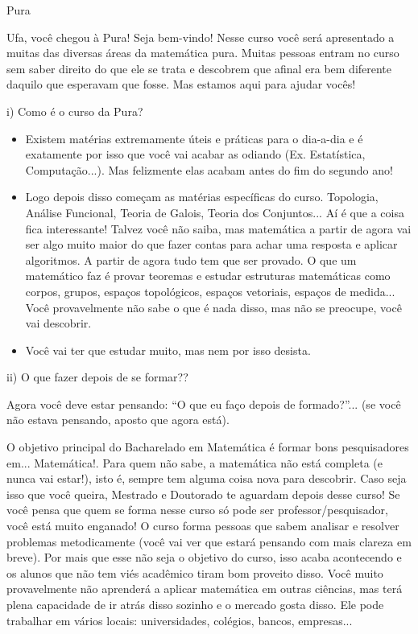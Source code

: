 \begin{subsecao}{Pura}


Ufa, você chegou à Pura! Seja bem-vindo! Nesse curso você será apresentado a
muitas das diversas áreas da matemática pura. Muitas pessoas entram no curso
sem saber direito do que ele se trata e descobrem que afinal era bem diferente
daquilo que esperavam que fosse. Mas estamos aqui para ajudar vocês!

i) Como é o curso da Pura?

\begin{itemize}


\item  Existem matérias extremamente úteis e práticas para o dia-a-dia e é
exatamente por isso que você vai acabar as odiando (Ex. Estatística,
Computação...). Mas felizmente elas acabam antes do fim do segundo ano!
\item  Logo depois disso começam as matérias específicas do curso. Topologia,
Análise Funcional, Teoria de Galois, Teoria dos Conjuntos... Aí é que a coisa
fica interessante! Talvez você não saiba, mas matemática a partir de agora vai
ser algo muito maior do que fazer contas para achar uma resposta e aplicar
algoritmos. A partir de agora tudo tem que ser provado. O que um matemático
faz é provar teoremas e estudar estruturas matemáticas como corpos, grupos,
espaços topológicos, espaços vetoriais, espaços de medida... Você provavelmente
não sabe o que é nada disso, mas não se preocupe, você vai descobrir.
\item  Você vai ter que estudar muito, mas nem por isso desista.

\end{itemize}
ii) O que fazer depois de se formar??

Agora você deve estar pensando: ``O que eu faço depois de formado?''... (se você
não estava pensando, aposto que agora está).

O objetivo principal do Bacharelado em Matemática é formar bons pesquisadores
em... Matemática!. Para quem não
sabe, a matemática não está completa (e nunca vai estar!), isto é, sempre tem
alguma coisa nova para descobrir. Caso seja isso que você queira, Mestrado e
Doutorado te aguardam depois desse curso! Se você pensa que quem se forma nesse
curso só pode ser professor/pesquisador, você está muito enganado! O curso forma
pessoas que sabem analisar e resolver problemas metodicamente (você vai ver que
estará pensando com mais clareza em breve). Por mais que esse não seja o objetivo
do curso, isso acaba acontecendo e os alunos que não tem viés acadêmico tiram bom
proveito disso. Você muito provavelmente não aprenderá a aplicar matemática em
outras ciências, mas terá plena capacidade de ir atrás disso sozinho e o mercado
gosta disso. Ele pode trabalhar em vários locais: universidades, colégios, bancos,
empresas...


\end{subsecao}
